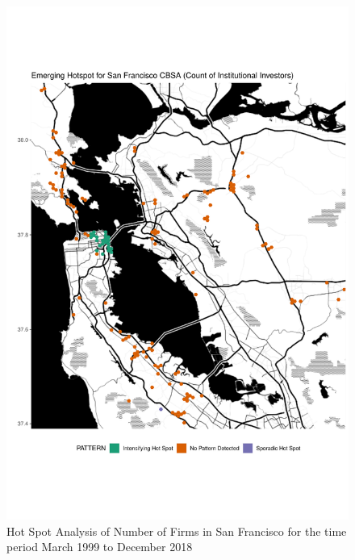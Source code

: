 \begin{figure}
	\centering
	\includegraphics[width=1\linewidth]{Figures/ChapterIV/SF_Count_EH}
	\caption[Hot Spot Analysis of Number of Firms in San Francisco CBSA 1999-2018]{Hot Spot Analysis of Number of Firms in San Francisco for the time period March 1999 to December 2018}
	\label{fig:SFcounthotspot}
\end{figure}

